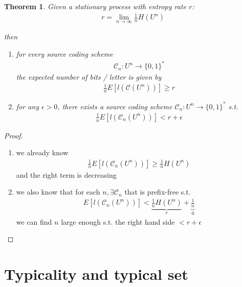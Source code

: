 \documentclass[twoside]{article}
\newtheorem{theorem}{Theorem}[section]
\theoremstyle{definition} %
\def\C{\mathcal{C}}
\begin{document}

\begin{theorem}
  Given a stationary process with entropy rate $r$:
  \begin{align*}
    r = \lim_{n \rightarrow \infty} \frac{1}{n} H(U^n)
  \end{align*}

  then
  \begin{enumerate}
    \item for every source coding scheme
    \begin{align*}
      \C_n: U^n \rightarrow \{0, 1\}^*
    \end{align*}
    the expected number of bits / letter is given by
    \begin{align*}
      \frac{1}{n} E[l(\C(U^n))] \geq r
    \end{align*}
    \item for any $\epsilon > 0$, there exists a source coding scheme $\C_n: U^n \rightarrow \{0, 1\}^*$ s.t.
    \begin{align*}
      \frac{1}{n} E[l(\C_n(U^n))] < r + \epsilon
    \end{align*}
  \end{enumerate}
\end{theorem}

\begin{proof}
  \begin{enumerate}
    \item we already know
    \begin{align*}
      \frac{1}{n} E[l(\C_n(U^n))] \geq \frac{1}{n} H(U^n)
    \end{align*}
    and the right term is decreasing
    \item we also know that for each $n, \exists \C_n$ that is prefix-free s.t.
    \begin{align*}
      E[l(\C_n(U^n))] < \underbrace{\frac{1}{n} H(U^n)}_{r} + \underbrace{\frac{1}{n}}_{0}
    \end{align*}
    we can find $n$ large enough s.t. the right hand side $< r + \epsilon$
  \end{enumerate}
\end{proof}


\cleardoublepage
\section{Typicality and typical set}
\end{document}
